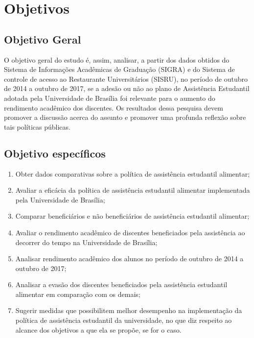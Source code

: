 
\section{Objetivos}%

\subsection{Objetivo Geral}
O objetivo geral do estudo é, assim, analisar, a partir dos dados obtidos do Sistema de Informações Acadêmicas de Graduação (SIGRA) e do Sistema de controle de acesso ao Restaurante Universitários (SISRU), no período de outubro de 2014 a outubro de 2017, se a adesão ou não ao plano de Assistência Estudantil adotada pela Universidade de Brasília foi relevante para o aumento do rendimento acadêmico dos discentes. Os resultados dessa pesquisa devem promover a discussão acerca do assunto e promover uma profunda reflexão sobre tais políticas públicas.


\subsection{Objetivo específicos}


\begin{enumerate}
	\item Obter dados comparativas sobre a política de assistência estudantil alimentar;
	
	\item Avaliar a eficácia da política de assistência estudantil alimentar implementada pela Universidade de Brasília;
	
	\item Comparar beneficiários e não beneficiários de assistência estudantil alimentar;
	
	\item Avaliar o rendimento acadêmico de discentes beneficiados pela assistência ao decorrer do tempo na Universidade de Brasília; 
	
	\item Analisar rendimento acadêmico dos alunos no período de outubro de 2014 a outubro de 2017;
	
	\item Analisar a evasão dos discentes beneficiados pela assistência estudantil alimentar em comparação com os demais;
	
	\item Sugerir medidas que possibilitem melhor desempenho na implementação da política de assistência estudantil da universidade, no que diz respeito ao alcance dos objetivos a que ela se propõe, se for o caso.
	
\end{enumerate}%

